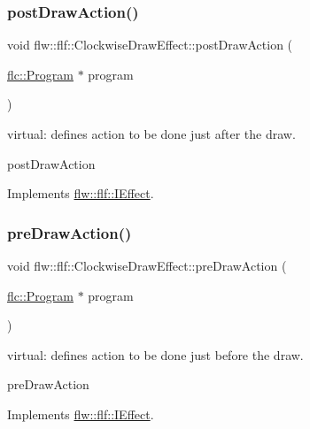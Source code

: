 \subsubsection{\texorpdfstring{post\+Draw\+Action()}{postDrawAction()}}
{\footnotesize\ttfamily void flw\+::flf\+::\+Clockwise\+Draw\+Effect\+::post\+Draw\+Action (\begin{DoxyParamCaption}\item[{\hyperlink{classflw_1_1flc_1_1Program}{flc\+::\+Program} $\ast$}]{program }\end{DoxyParamCaption})\hspace{0.3cm}{\ttfamily [virtual]}}



virtual\+: defines action to be done just after the draw. 

post\+Draw\+Action 

Implements \hyperlink{classflw_1_1flf_1_1IEffect_a6bb11d90e7e4da057ca398bd8c61208a}{flw\+::flf\+::\+I\+Effect}.

\mbox{\label{classflw_1_1flf_1_1ClockwiseDrawEffect_ab6a8333c2a80dbc56190b73f3d06264e}} 
\subsubsection{\texorpdfstring{pre\+Draw\+Action()}{preDrawAction()}}
{\footnotesize\ttfamily void flw\+::flf\+::\+Clockwise\+Draw\+Effect\+::pre\+Draw\+Action (\begin{DoxyParamCaption}\item[{\hyperlink{classflw_1_1flc_1_1Program}{flc\+::\+Program} $\ast$}]{program }\end{DoxyParamCaption})\hspace{0.3cm}{\ttfamily [virtual]}}



virtual\+: defines action to be done just before the draw. 

pre\+Draw\+Action 

Implements \hyperlink{classflw_1_1flf_1_1IEffect_ae65eed21e40a226c7739d3c5dedd9e50}{flw\+::flf\+::\+I\+Effect}.

\mbox{\label{classflw_1_1flf_1_1ClockwiseDrawEffect_a5d6c2f7e723f845f615572721f79a5a8}} 
